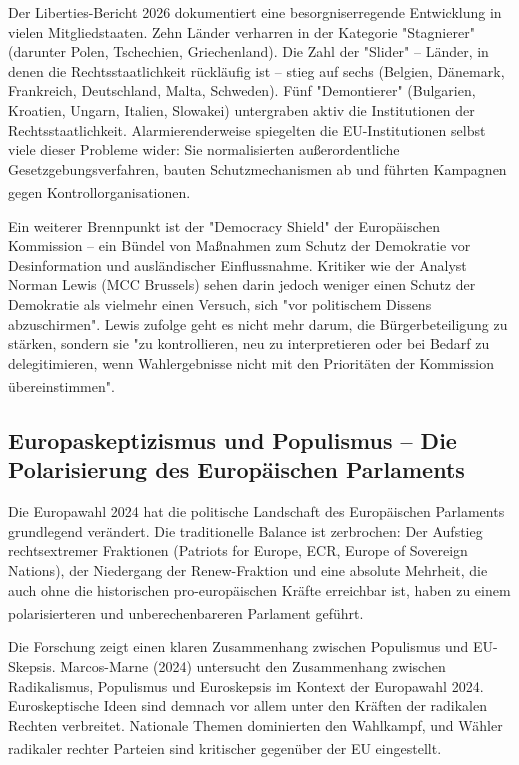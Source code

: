 \documentclass[12pt,a4paper]{article}
\newcommand{\footcite}[1]{\textsuperscript{\cite{#1}}}
\begin{document}
	Der Liberties-Bericht 2026 dokumentiert eine besorgniserregende Entwicklung in vielen Mitgliedstaaten. Zehn Länder verharren in der Kategorie "Stagnierer" (darunter Polen, Tschechien, Griechenland). Die Zahl der "Slider" – Länder, in denen die Rechtsstaatlichkeit rückläufig ist – stieg auf sechs (Belgien, Dänemark, Frankreich, Deutschland, Malta, Schweden). Fünf "Demontierer" (Bulgarien, Kroatien, Ungarn, Italien, Slowakei) untergraben aktiv die Institutionen der Rechtsstaatlichkeit. Alarmierenderweise spiegelten die EU-Institutionen selbst viele dieser Probleme wider: Sie normalisierten außerordentliche Gesetzgebungsverfahren, bauten Schutzmechanismen ab und führten Kampagnen gegen Kontrollorganisationen.\footcite{Liberties2026}
	
	Ein weiterer Brennpunkt ist der "Democracy Shield" der Europäischen Kommission – ein Bündel von Maßnahmen zum Schutz der Demokratie vor Desinformation und ausländischer Einflussnahme. Kritiker wie der Analyst Norman Lewis (MCC Brussels) sehen darin jedoch weniger einen Schutz der Demokratie als vielmehr einen Versuch, sich "vor politischem Dissens abzuschirmen". Lewis zufolge geht es nicht mehr darum, die Bürgerbeteiligung zu stärken, sondern sie "zu kontrollieren, neu zu interpretieren oder bei Bedarf zu delegitimieren, wenn Wahlergebnisse nicht mit den Prioritäten der Kommission übereinstimmen".\footcite{Lewis2026}
	
	\subsection{Europaskeptizismus und Populismus – Die Polarisierung des Europäischen Parlaments}
	
	Die Europawahl 2024 hat die politische Landschaft des Europäischen Parlaments grundlegend verändert. Die traditionelle Balance ist zerbrochen: Der Aufstieg rechtsextremer Fraktionen (Patriots for Europe, ECR, Europe of Sovereign Nations), der Niedergang der Renew-Fraktion und eine absolute Mehrheit, die auch ohne die historischen pro-europäischen Kräfte erreichbar ist, haben zu einem polarisierteren und unberechenbareren Parlament geführt.\footcite{Delors2025}
	
	Die Forschung zeigt einen klaren Zusammenhang zwischen Populismus und EU-Skepsis. Marcos-Marne (2024) untersucht den Zusammenhang zwischen Radikalismus, Populismus und Euroskepsis im Kontext der Europawahl 2024. Euroskeptische Ideen sind demnach vor allem unter den Kräften der radikalen Rechten verbreitet. Nationale Themen dominierten den Wahlkampf, und Wähler radikaler rechter Parteien sind kritischer gegenüber der EU eingestellt.\footcite{MarcosMarne2024}
	
\end{document}
